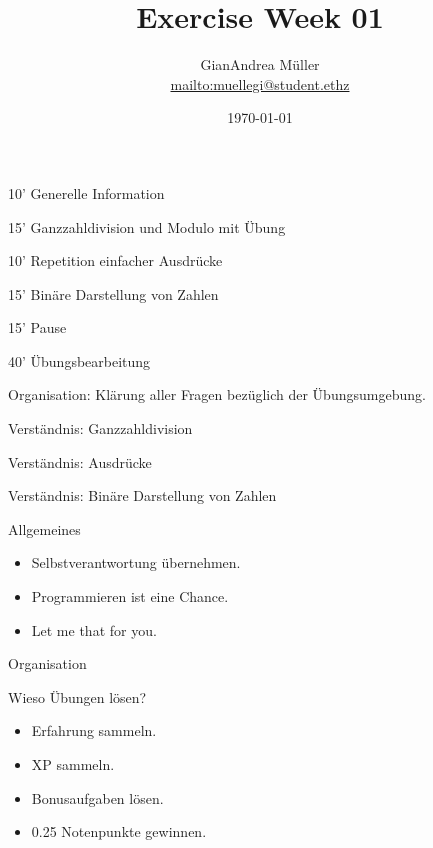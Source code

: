 \documentclass[handout,usenames,dvipsnames]{beamer}
\title{Exercise Week 01}
\author{GianAndrea Müller\\ \url{mailto:muellegi@student.ethz}}
\date{\today}
\begin{document}
\maketitle

\begin{TFTimeSchedule}
\item 10' Generelle Information
\item 15' Ganzzahldivision und Modulo mit Übung
\item 10' Repetition einfacher Ausdrücke
\item 15' Binäre Darstellung von Zahlen 
\item 15' Pause
\item 40' Übungsbearbeitung
\end{TFTimeSchedule}

\begin{TFLearningObjectives}
\item Organisation: Klärung aller Fragen bezüglich der Übungsumgebung.
\item Verständnis: Ganzzahldivision
\item Verständnis: Ausdrücke
\item Verständnis: Binäre Darstellung von Zahlen
\end{TFLearningObjectives}

\begin{frame}{Allgemeines}
\begin{itemize}
\item Selbstverantwortung übernehmen.
\item Programmieren ist eine Chance.
\item Let me  that for you.
\end{itemize}
\end{frame}

\begin{frame}{Organisation}

\begin{block}{Wieso Übungen lösen?}
\begin{itemize}
\item Erfahrung sammeln.
\item XP sammeln.
\item Bonusaufgaben lösen.
\item 0.25 Notenpunkte gewinnen.
\end{itemize}
\end{block}

\vfill





\end{frame}
\end{document}
